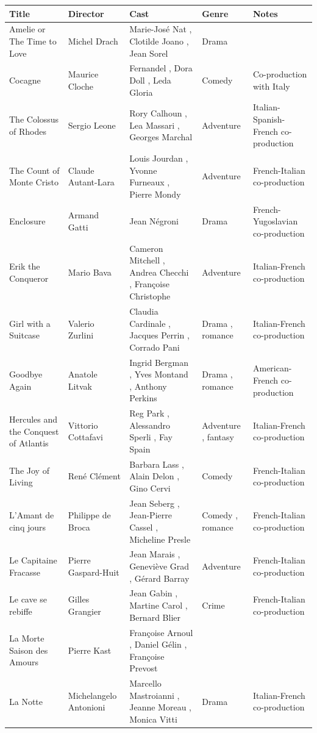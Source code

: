 \documentclass{article}
\begin{document}
\begin{tabular}{lllll}
\toprule
Title & Director & Cast & Genre & Notes \\
\midrule
Amelie or The Time to Love & Michel Drach & Marie-José Nat , Clotilde Joano , Jean Sorel & Drama &  \\
Cocagne & Maurice Cloche & Fernandel , Dora Doll , Leda Gloria & Comedy & Co-production with Italy \\
The Colossus of Rhodes & Sergio Leone & Rory Calhoun , Lea Massari , Georges Marchal & Adventure & Italian-Spanish-French co-production \\
The Count of Monte Cristo & Claude Autant-Lara & Louis Jourdan , Yvonne Furneaux , Pierre Mondy & Adventure & French-Italian co-production \\
Enclosure & Armand Gatti & Jean Négroni & Drama & French-Yugoslavian co-production \\
Erik the Conqueror & Mario Bava & Cameron Mitchell , Andrea Checchi , Françoise Christophe & Adventure & Italian-French co-production \\
Girl with a Suitcase & Valerio Zurlini & Claudia Cardinale , Jacques Perrin , Corrado Pani & Drama , romance & Italian-French co-production \\
Goodbye Again & Anatole Litvak & Ingrid Bergman , Yves Montand , Anthony Perkins & Drama , romance & American-French co-production \\
Hercules and the Conquest of Atlantis & Vittorio Cottafavi & Reg Park , Alessandro Sperli , Fay Spain & Adventure , fantasy & Italian-French co-production \\
The Joy of Living & René Clément & Barbara Lass , Alain Delon , Gino Cervi & Comedy & French-Italian co-production \\
L'Amant de cinq jours & Philippe de Broca & Jean Seberg , Jean-Pierre Cassel , Micheline Presle & Comedy , romance & French-Italian co-production \\
Le Capitaine Fracasse & Pierre Gaspard-Huit & Jean Marais , Geneviève Grad , Gérard Barray & Adventure & French-Italian co-production \\
Le cave se rebiffe & Gilles Grangier & Jean Gabin , Martine Carol , Bernard Blier & Crime & French-Italian co-production \\
La Morte Saison des Amours & Pierre Kast & Françoise Arnoul , Daniel Gélin , Françoise Prevost &  &  \\
La Notte & Michelangelo Antonioni & Marcello Mastroianni , Jeanne Moreau , Monica Vitti & Drama & Italian-French co-production \\

\end{tabular}
\end{document}
